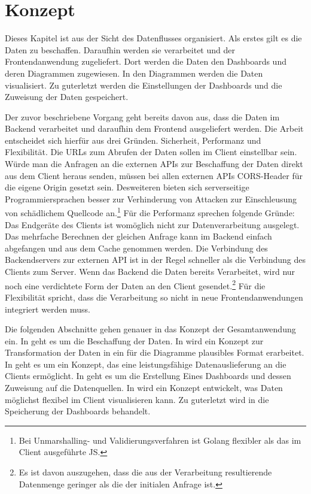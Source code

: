 \chapter{Konzept}
\label{chap:konzept}
\setcounter{footnote}{0}
Dieses Kapitel ist aus der Sicht des Datenflusses organisiert. Als erstes
gilt es die Daten zu beschaffen. Daraufhin werden sie verarbeitet und
der Frontendanwendung zugeliefert. Dort werden die Daten den Dashboards
und deren Diagrammen zugewiesen. In den Diagrammen werden die Daten
visualisiert. Zu guterletzt werden die Einstellungen der Dashboards
und die Zuweisung der Daten gespeichert.

Der zuvor beschriebene Vorgang geht bereits davon aus, dass die Daten im Backend
verarbeitet und daraufhin dem Frontend ausgeliefert werden. Die Arbeit entscheidet
sich hierfür aus drei Gründen. Sicherheit, Performanz und Flexibilität. Die URLs
zum Abrufen der Daten sollen im Client einstellbar sein. Würde man die Anfragen an
die externen APIs zur Beschaffung der Daten direkt aus dem Client heraus senden,
müssen bei allen externen APIs CORS-Header für die eigene Origin gesetzt sein\cite{CORSW3C}.
Desweiteren bieten sich serverseitige Programmiersprachen besser zur Verhinderung
von Attacken zur Einschleusung von schädlichem Quellcode an.\footnote{Bei
Unmarshalling- und Validierungsverfahren ist Golang flexibler als das im Client ausgeführte JS.}
Für die Performanz sprechen folgende Gründe: Das Endgeräte des Clients ist womöglich
nicht zur Datenverarbeitung ausgelegt. Das mehrfache Berechnen der gleichen Anfrage
kann im Backend einfach abgefangen und aus dem Cache genommen werden. Die Verbindung
des Backendservers zur externen API ist in der Regel schneller als die Verbindung
des Clients zum Server. Wenn das Backend die Daten bereits Verarbeitet, wird nur noch
eine verdichtete Form der Daten an den Client gesendet.\footnote{Es ist davon auszugehen, dass
die aus der Verarbeitung resultierende Datenmenge geringer als die der initialen Anfrage ist.}
Für die Flexibilität spricht, dass die Verarbeitung so nicht in neue Frontendanwendungen
integriert werden muss.

Die folgenden Abschnitte gehen genauer in das Konzept der Gesamtanwendung ein.
In  geht es um die Beschaffung der Daten. In 
wird ein Konzept zur Transformation der Daten in ein für die Diagramme plausibles Format
erarbeitet. In  geht es um ein Konzept, das
eine leistungsfähige Datenauslieferung an die Clients ermöglicht. In 
geht es um die Erstellung Eines Dashboards und dessen Zuweisung auf die
Datenquellen. In  wird ein Konzept entwickelt,
was Daten möglichst flexibel im Client visualisieren kann.
Zu guterletzt wird in  die Speicherung der Dashboards behandelt.

